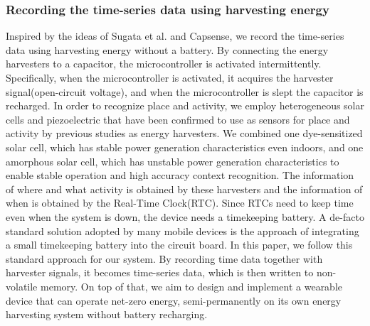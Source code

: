 \documentclass[conference]{IEEEtran}
\begin{document}
\subsubsection{Recording the time-series data using harvesting energy}
Inspired by the ideas of Sugata et al.\cite{sugata2019battery} and Capsense\cite{lan2017capsense, lan2020capacitor}, we record the time-series data using harvesting energy without a battery.
By connecting the energy harvesters to a capacitor, the microcontroller is activated intermittently.
Specifically, when the microcontroller is activated, it acquires the harvester signal(open-circuit voltage), and when the microcontroller is slept the capacitor is recharged.
In order to recognize place and activity, we employ heterogeneous solar cells and piezoelectric that have been confirmed to use as sensors for place and activity by previous studies\cite{umetsu2019ehaas, sugata2019battery,khalifa2017harke} as energy harvesters.
We combined one dye-sensitized solar cell, which has stable power generation characteristics even indoors, and one amorphous solar cell, which has unstable power generation characteristics to enable stable operation and high accuracy context recognition.
The information of where and what activity is obtained by these harvesters and the information of when is obtained by the Real-Time Clock(RTC).
Since RTCs need to keep time even when the system is down, the device needs a timekeeping battery.
A de-facto standard solution adopted by many mobile devices is the approach of integrating a small timekeeping battery into the circuit board.
In this paper, we follow this standard approach for our system.
By recording time data together with harvester signals, it becomes time-series data, which is then written to non-volatile memory.
On top of that, we aim to design and implement a wearable device that can operate net-zero energy, semi-permanently on its own energy harvesting system without battery recharging.
\end{document}
